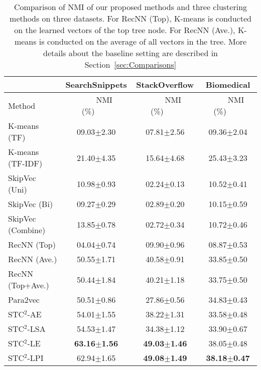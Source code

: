 \documentclass[review]{elsarticle}
\begin{document}
\begin{table*}[t] \begin{center}
\begin{tabular}{|l|c|c|c|}\hline
&SearchSnippets &StackOverflow &Biomedical\\\hline
Method      &~~~~NMI (\%)~~~~&~~~~NMI (\%)~~~~&~~~~NMI (\%)~~~~\\\hline \hline
K-means (TF)   &	09.03$\pm$2.30    & 07.81$\pm$2.56  &09.36$\pm$2.04    \\
K-means (TF-IDF)   &	21.40$\pm$4.35    & 15.64$\pm$4.68   &25.43$\pm$3.23 \\
SkipVec (Uni) & 10.98$\pm$0.93           & 02.24$\pm$0.13  & 10.52$\pm$0.41 \\
SkipVec (Bi)  & 09.27$\pm$0.29           & 02.89$\pm$0.20  & 10.15$\pm$0.59 \\
SkipVec (Combine)  & 13.85$\pm$0.78      & 02.72$\pm$0.34  & 10.72$\pm$0.46 \\
RecNN (Top) 	&04.04$\pm$0.74		&09.90$\pm$0.96   &08.87$\pm$0.53\\
RecNN (Ave.) 	&50.55$\pm$1.71		&40.58$\pm$0.91   &33.85$\pm$0.50\\
RecNN (Top+Ave.) &50.44$\pm$1.84	&40.21$\pm$1.18   &33.75$\pm$0.50\\
Para2vec & 50.51$\pm$0.86	&27.86$\pm$0.56	  &34.83$\pm$0.43\\
\hline
STC$^2$-AE&	54.01$\pm$1.55 & 38.22$\pm$1.31 &33.58$\pm$0.48\\
STC$^2$-LSA&	54.53$\pm$1.47	& 34.38$\pm$1.12   &33.90$\pm$0.67\\
STC$^2$-LE&	{\bf{63.16$\pm$1.56}}	& {\bf{49.03$\pm$1.46}}  &38.05$\pm$0.48\\
STC$^2$-LPI&	62.94$\pm$1.65	& {\bf{49.08$\pm$1.49}} &{\bf{38.18$\pm$0.47}}\\\hline

\end{tabular}
\end{center}
\caption{\label{tb:ComparisonNMI} Comparison of NMI of our proposed methods and three clustering methods on three datasets. For RecNN (Top), K-means is conducted on the learned vectors of the top tree node. For RecNN (Ave.), K-means is conducted on the average of all vectors in the tree. More details about the baseline setting are described in Section~\ref{sec:Comparisons}}
\end{table*}
\end{document}
